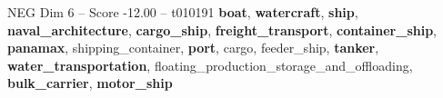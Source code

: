 \begin{textsample}{NEG Dim 6 – Score -12.00 – t010191}  \label{ex:f6_neg_010}
\textbf{boat}, \textbf{watercraft}, \textbf{ship}, \textbf{naval\_architecture}, \textbf{cargo\_ship}, \textbf{freight\_transport}, \textbf{container\_ship}, \textbf{panamax}, shipping\_container, \textbf{port}, cargo, feeder\_ship, \textbf{tanker}, \textbf{water\_transportation}, floating\_production\_storage\_and\_offloading, \textbf{bulk\_carrier}, \textbf{motor\_ship}

\end{textsample}
